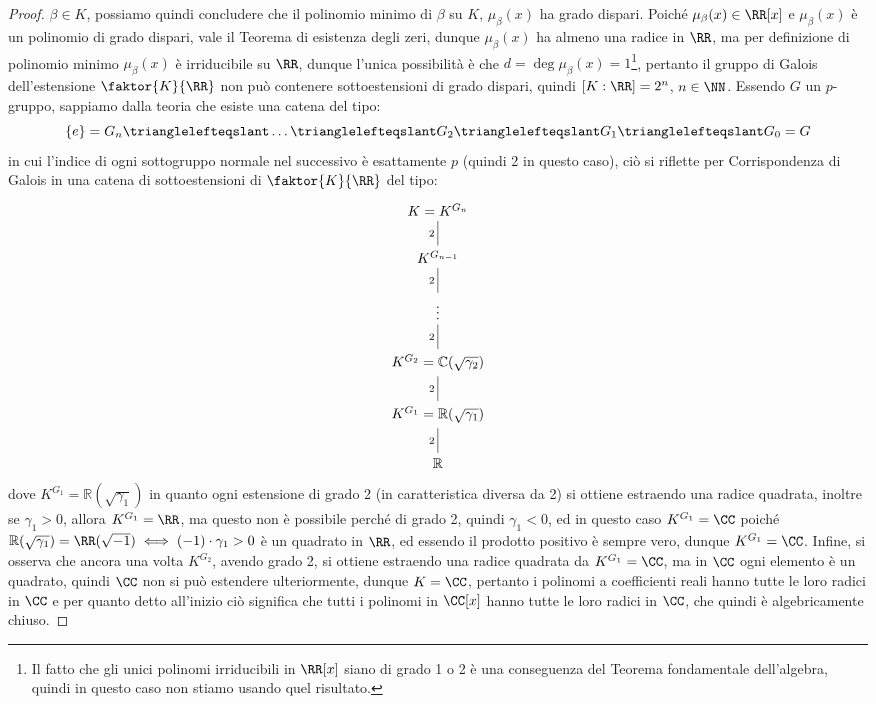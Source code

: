 \documentclass[11pt]{scrartcl}
\begin{document}
\begin{proof}
    $\beta \in K$, possiamo quindi concludere che il polinomio minimo di $\beta$ su $K$, $\mu_\beta(x)$ ha grado dispari. Poiché $\mu_\beta(x) \in \RR[x]$ e $\mu_\beta(x)$ è un polinomio di grado dispari, vale il Teorema di esistenza degli zeri, dunque $\mu_\beta(x)$ ha almeno una radice in $\RR$, ma 
    per definizione di polinomio minimo $\mu_\beta(x)$ è irriducibile su $\RR$, dunque l'unica possibilità è che $d = \deg \mu_\beta(x) = 1$\footnote{Il fatto che gli unici polinomi irriducibili in $\RR[x]$ siano di grado 1 o 2 è una conseguenza del Teorema fondamentale dell'algebra, quindi in questo caso non 
    stiamo usando quel risultato.}, pertanto il gruppo di Galois dell'estensione $\faktor{K}{\RR}$ non può contenere sottoestensioni di grado dispari, quindi $[K : \RR] = 2^n$, $n \in \NN$. Essendo $G$ un $p$-gruppo, sappiamo dalla teoria che esiste una catena del tipo:
    \[ \{e\} = G_n \trianglelefteqslant \ldots \trianglelefteqslant G_2 \trianglelefteqslant G_1 \trianglelefteqslant G_0 = G
        \]
    in cui l'indice di ogni sottogruppo normale nel successivo è esattamente $p$ (quindi 2 in questo caso), ciò si riflette per Corrispondenza di Galois in una catena di sottoestensioni di $\faktor{K}{\RR}$ del tipo:
    \[\begin{tikzcd}
        {K = K^{G_n}} \\
        {K^{G_{n-1}}} \\
        \vdots \\
        {K^{G_2} = \mathbb{C}(\sqrt{\gamma_2})} \\
        {K^{G_1} = \mathbb{R}(\sqrt{\gamma_1})} \\
        {\mathbb{R}}
        \arrow["2"', no head, from=1-1, to=2-1]
        \arrow["2"', no head, from=2-1, to=3-1]
        \arrow["2"', no head, from=3-1, to=4-1]
        \arrow["2"', no head, from=5-1, to=6-1]
        \arrow["2"', no head, from=4-1, to=5-1]
    \end{tikzcd}\]
    dove $K^{G_1} = \mathbb{R}(\sqrt{\gamma_1})$ in quanto ogni estensione di grado 2 (in caratteristica diversa da 2) si ottiene estraendo una radice quadrata, inoltre se $\gamma_1 > 0$, allora $K^{G_1} = \RR$, ma questo non è possibile perché di grado 2, quindi $\gamma_1 < 0$, ed in questo caso $K^{G_1} = \CC$ 
    poiché $\mathbb{R}(\sqrt{\gamma_1}) = \RR(\sqrt{-1}) \iff (-1)\cdot \gamma_1 > 0 $ è un quadrato in $\RR$, ed essendo il prodotto positivo è sempre vero, dunque $K^{G_1} = \CC$. Infine, si osserva che ancora una volta $K^{G_2}$, avendo grado 2, si ottiene estraendo una radice quadrata da $K^{G_1} = \CC$, ma in $\CC$ ogni 
    elemento è un quadrato, quindi $\CC$ non si può estendere ulteriormente, dunque $K = \CC$, pertanto i polinomi a coefficienti reali hanno tutte le loro radici in $\CC$ e per quanto detto all'inizio ciò significa che tutti i polinomi in $\CC[x]$ hanno tutte le loro radici in $\CC$, che quindi è algebricamente chiuso.
\end{proof}
\end{document}
